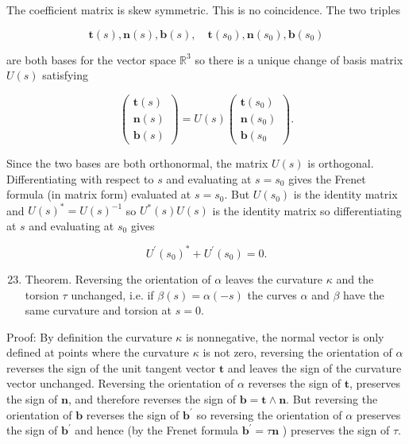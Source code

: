 \documentclass[10pt]{article}
\begin{document}
The coefficient matrix is skew symmetric. This is no coincidence. The two triples

$$
\mathbf{t}(s), \mathbf{n}(s), \mathbf{b}(s), \quad \mathbf{t}\left(s_{0}\right), \mathbf{n}\left(s_{0}\right), \mathbf{b}\left(s_{0}\right)
$$

are both bases for the vector space $\mathbb{R}^{3}$ so there is a unique change of basis matrix $U(s)$ satisfying

$$
\left(\begin{array}{c}
\mathbf{t}(s) \\
\mathbf{n}(s) \\
\mathbf{b}(s)
\end{array}\right)=U(s)\left(\begin{array}{c}
\mathbf{t}\left(s_{0}\right) \\
\mathbf{n}\left(s_{0}\right) \\
\mathbf{b}\left(s_{0}\right.
\end{array}\right) .
$$

Since the two bases are both orthonormal, the matrix $U(s)$ is orthogonal. Differentiating with respect to $s$ and evaluating at $s=s_{0}$ gives the Frenet formula (in matrix form) evaluated at $s=s_{0}$. But $U\left(s_{0}\right)$ is the identity matrix and $U(s)^{*}=U(s)^{-1}$ so $U^{*}(s) U(s)$ is the identity matrix so differentiating at $s$ and evaluating at $s_{0}$ gives

$$
U^{\prime}\left(s_{0}\right)^{*}+U^{\prime}\left(s_{0}\right)=0 .
$$

\begin{enumerate}
  \setcounter{enumi}{22}
  \item Theorem. Reversing the orientation of $\alpha$ leaves the curvature $\kappa$ and the torsion $\tau$ unchanged, i.e. if $\beta(s)=\alpha(-s)$ the curves $\alpha$ and $\beta$ have the same curvature and torsion at $s=0$.
\end{enumerate}

Proof: By definition the curvature $\kappa$ is nonnegative, the normal vector is only defined at points where the curvature $\kappa$ is not zero, reversing the orientation of $\alpha$ reverses the sign of the unit tangent vector $\mathbf{t}$ and leaves the sign of the curvature vector unchanged. Reversing the orientation of $\alpha$ reverses the sign of $\mathbf{t}$, preserves the sign of $\mathbf{n}$, and therefore reverses the sign of $\mathbf{b}=\mathbf{t} \wedge \mathbf{n}$. But reversing the orientation of $\mathbf{b}$ reverses the sign of $\mathbf{b}^{\prime}$ so reversing the orientation of $\alpha$ preserves the sign of $\mathbf{b}^{\prime}$ and hence (by the Frenet formula $\mathbf{b}^{\prime}=\tau \mathbf{n}$ ) preserves the sign of $\tau$.
\end{document}
